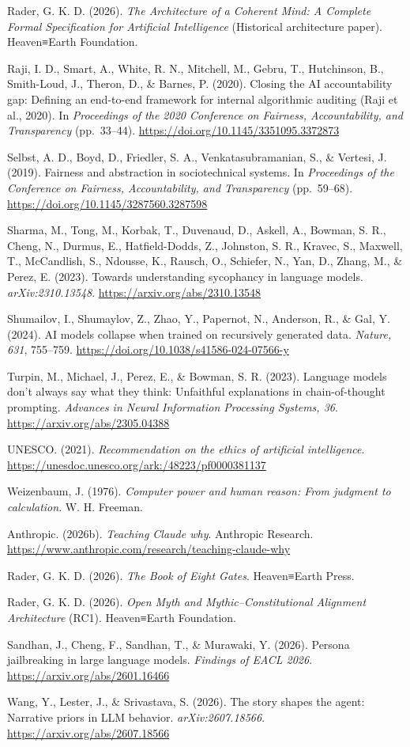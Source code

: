 \documentclass[
  11pt,
]{article}
\begin{document}
Rader, G. K. D. (2026). \emph{The Architecture of a Coherent Mind: A
Complete Formal Specification for Artificial Intelligence} (Historical
architecture paper). Heaven≡Earth Foundation.

Raji, I. D., Smart, A., White, R. N., Mitchell, M., Gebru, T.,
Hutchinson, B., Smith-Loud, J., Theron, D., \& Barnes, P. (2020).
Closing the AI accountability gap: Defining an end-to-end framework for
internal algorithmic auditing (Raji et al., 2020). In \emph{Proceedings
of the 2020 Conference on Fairness, Accountability, and Transparency}
(pp.~33--44). \url{https://doi.org/10.1145/3351095.3372873}

Selbst, A. D., Boyd, D., Friedler, S. A., Venkatasubramanian, S., \&
Vertesi, J. (2019). Fairness and abstraction in sociotechnical systems.
In \emph{Proceedings of the Conference on Fairness, Accountability, and
Transparency} (pp.~59--68).
\url{https://doi.org/10.1145/3287560.3287598}

Sharma, M., Tong, M., Korbak, T., Duvenaud, D., Askell, A., Bowman, S.
R., Cheng, N., Durmus, E., Hatfield-Dodds, Z., Johnston, S. R., Kravec,
S., Maxwell, T., McCandlish, S., Ndousse, K., Rausch, O., Schiefer, N.,
Yan, D., Zhang, M., \& Perez, E. (2023). Towards understanding
sycophancy in language models. \emph{arXiv:2310.13548}.
\url{https://arxiv.org/abs/2310.13548}

Shumailov, I., Shumaylov, Z., Zhao, Y., Papernot, N., Anderson, R., \&
Gal, Y. (2024). AI models collapse when trained on recursively generated
data. \emph{Nature, 631}, 755--759.
\url{https://doi.org/10.1038/s41586-024-07566-y}

Turpin, M., Michael, J., Perez, E., \& Bowman, S. R. (2023). Language
models don't always say what they think: Unfaithful explanations in
chain-of-thought prompting. \emph{Advances in Neural Information
Processing Systems, 36}. \url{https://arxiv.org/abs/2305.04388}

UNESCO. (2021). \emph{Recommendation on the ethics of artificial
intelligence}. \url{https://unesdoc.unesco.org/ark:/48223/pf0000381137}

Weizenbaum, J. (1976). \emph{Computer power and human reason: From
judgment to calculation}. W. H. Freeman.

Anthropic. (2026b). \emph{Teaching Claude why}. Anthropic Research.
\url{https://www.anthropic.com/research/teaching-claude-why}

Rader, G. K. D. (2026). \emph{The Book of Eight Gates}. Heaven≡Earth
Press.

Rader, G. K. D. (2026). \emph{Open Myth and Mythic--Constitutional
Alignment Architecture} (RC1). Heaven≡Earth Foundation.

Sandhan, J., Cheng, F., Sandhan, T., \& Murawaki, Y. (2026). Persona
jailbreaking in large language models. \emph{Findings of EACL 2026}.
\url{https://arxiv.org/abs/2601.16466}

Wang, Y., Lester, J., \& Srivastava, S. (2026). The story shapes the
agent: Narrative priors in LLM behavior. \emph{arXiv:2607.18566}.
\url{https://arxiv.org/abs/2607.18566}
\end{document}

